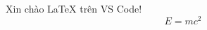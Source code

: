 \documentclass{article}
\begin{document}
Xin chào LaTeX trên VS Code!
\[ E = mc^2 \]
\end{document}
